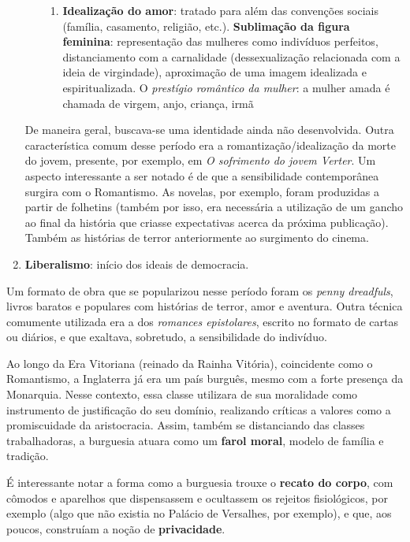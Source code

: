 \documentclass[12pt]{book}
\begin{document}
\begin{enumerate}
\begin{enumerate}
\begin{enumerate}
					\item \textbf{Idealização do amor}: tratado para além das convenções sociais (família, casamento, religião, etc.).
					\textbf{Sublimação da figura feminina}: representação das mulheres como indivíduos perfeitos, distanciamento com a carnalidade (dessexualização relacionada com a ideia de virgindade), aproximação de uma imagem idealizada e espiritualizada. O \textit{prestígio romântico da mulher}: a mulher amada é chamada de virgem, anjo, criança, irmã
				\end{enumerate}
			\end{enumerate}
			\par De maneira geral, buscava-se uma identidade ainda não desenvolvida. Outra característica comum desse período era a romantização/idealização da morte do jovem, presente, por exemplo, em \textit{O sofrimento do jovem Verter}. Um aspecto interessante a ser notado é de que a sensibilidade contemporânea surgira com o Romantismo. As novelas, por exemplo, foram produzidas a partir de folhetins (também por isso, era necessária a utilização de um gancho ao final da história que criasse expectativas acerca da próxima publicação). Também as histórias de terror anteriormente ao surgimento do cinema.
			\item \textbf{Liberalismo}: início dos ideais de democracia.
		\end{enumerate}
		\par Um formato de obra que se popularizou nesse período foram os \textit{penny dreadfuls}, livros baratos e populares com histórias de terror, amor e aventura. Outra técnica comumente utilizada era a dos \textit{romances epistolares}, escrito no formato de cartas ou diários, e que exaltava, sobretudo, a sensibilidade do indivíduo.
		\par Ao longo da Era Vitoriana (reinado da Rainha Vitória), coincidente como o Romantismo, a Inglaterra já era um país burguês, mesmo com a forte presença da Monarquia. Nesse contexto, essa classe utilizara de sua moralidade como instrumento de justificação do seu domínio, realizando críticas a valores como a promiscuidade da aristocracia. Assim, também se distanciando das classes trabalhadoras, a burguesia atuara como um \textbf{farol moral}, modelo de família e tradição.
		\par É interessante notar a forma como a burguesia trouxe o \textbf{recato do corpo}, com cômodos e aparelhos que dispensassem e ocultassem os rejeitos fisiológicos, por exemplo (algo que não existia no Palácio de Versalhes, por exemplo), e que, aos poucos, construíam a noção de \textbf{privacidade}.
\end{document}
